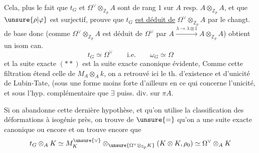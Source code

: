 Cela, plus le fait que $t_G$ et $\Omega^{\vee}\otimes_{\mathbb Z_p}A$ sont de rang $1$ sur $A$ resp. $A\otimes_{\mathbb Z_p}A$, et que $\unsure{\rho|\varphi}$ est surjectif, prouve que $t_G$ \uline{est déduit de} $\Omega^{\vee}\otimes_{\mathbb Z_p}A$ par le changt. de base
donc  (comme $\Omega^{\vee}\otimes_{\mathbb Z_p}A$ est déduit de $\Omega^{\vee}$ par $A\xrightarrow{\lambda\longrightarrow\lambda\otimes1}A\otimes_{\mathbb Z_p}A$)  obtient un isom can.
\[
t_G\simeq\Omega^{\vee}\qquad\text{i.e.}\qquad\omega_G\simeq\Omega
\]
et la suite exacte $(**)$ est la suite exacte canonique évidente,  Comme cette filtration étend celle de $M_A\otimes_A k$, on a retrouvé ici le th. d'existence et d'unicité de Lubin-Tate, (sous une forme moins forte d'ailleurs en ce qui concerne l'unicité, et sous l'hyp. complémentaire que $\exists$ puiss. div. sur $\pi A$.

Si on abandonne cette dernière hypothèse, et qu'on utilise la classification des déformations à isogénie près, on trouve de $\unsure{=}$ qu'on a une suite exacte canonique
ou encore
et on trouve encore que
\[
t_G\otimes_A K\simeq M_K^{\unsure{\vee}}\otimes_{\unsure{\Omega^{\vee}\otimes_{\mathbb Z_p}K}}(K\otimes K,\rho_0)\simeq\Omega^{\vee}\otimes_A K
\]
